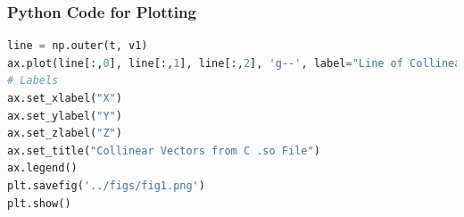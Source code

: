 \documentclass{beamer}
\theoremstyle{remark}
\numberwithin{equation}{section}
\begin{document}
\begin{frame}[fragile]
\frametitle{Python Code for Plotting}
\begin{lstlisting}[language=Python]
line = np.outer(t, v1)
ax.plot(line[:,0], line[:,1], line[:,2], 'g--', label="Line of Collinearity")
# Labels
ax.set_xlabel("X")
ax.set_ylabel("Y")
ax.set_zlabel("Z")
ax.set_title("Collinear Vectors from C .so File")
ax.legend()
plt.savefig('../figs/fig1.png')
plt.show()
\end{lstlisting}
\end{frame}
\end{document}
